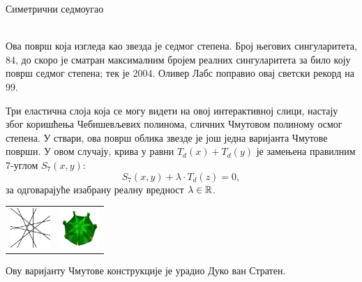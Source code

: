 \documentclass[sr]{./../../common/SurferDesc}%
\begin{document}
\footnotesize




\begin{surferPage}
  \begin{surferTitle}Симетрични седмоугао\end{surferTitle}   \\
    Ова површ која изгледа као звезда је седмог степена. Број његових сингуларитета, $84$, 
	до скоро је сматран максималним бројем реалних сингуларитета за било коју површ седмог степена;
    тек је 2004. Оливер Лабс поправио овај светски рекорд на $99$.
  
  
 Три еластична слоја која се могу видети на овој интерактивној слици, 
    настају због коришћења Чебишевљевих полинома, сличних Чмутовом 
    полиному осмог степена. 
    У ствари, ова површ облика звезде је још једна варијанта Чмутове површи.
    У овом случају, крива у равни $T_d(x)+T_d(y)$ је замењена правилним $7$-углом
    $S_7(x,y)$: 
   \[S_7(x,y) + \lambda \cdot T_d(z) = 0,\]
    за одговарајуће изабрану реалну вредност $\lambda\in{\mathbb R}$. 
    \vspace*{-0.3em}
    \begin{center}
      \begin{tabular}{c@{\qquad}c}
        \includegraphics[height=1.5cm]{./../../common/images/labsseptic1.pdf}
        &
        \includegraphics[height=1.5cm]{./../../common/images/septic_7eck_von_oben}
      \end{tabular}
    \end{center}
    \vspace*{-0.3em}   
   Ову варијанту Чмутове конструкције је урадио Дуко ван Стратен. 


  \begin{surferText}
     \end{surferText}
\end{surferPage}
\end{document}
